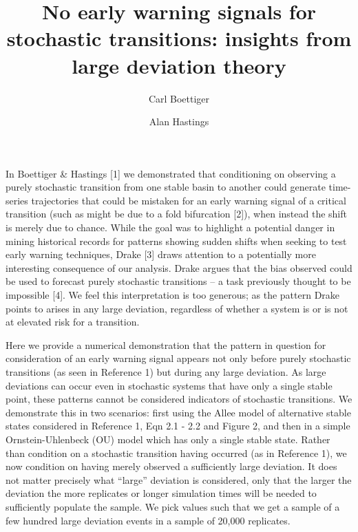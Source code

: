 \documentclass[review]{elsarticle} %
\begin{document}
\begin{frontmatter}
  \title{No early warning signals for stochastic transitions: insights from large
         deviation theory}
  \author[cstar]{Carl Boettiger}
  \address[cstar]{Center for Stock Assessment Research, Department of Applied Math and Statistics, University of California, Mail Stop SOE-2, Santa Cruz, CA 95064, USA}
  \author[esp]{Alan Hastings}
  \address[esp]{Department of Environmental Science and Policy, University of California, Davis, CA, 95616 United States}
 \end{frontmatter}


In Boettiger \& Hastings {[}1{]} we demonstrated that conditioning on
observing a purely stochastic transition from one stable basin to
another could generate time-series trajectories that could be mistaken
for an early warning signal of a critical transition (such as might be
due to a fold bifurcation {[}2{]}), when instead the shift is merely due
to chance. While the goal was to highlight a potential danger in mining
historical records for patterns showing sudden shifts when seeking to
test early warning techniques, Drake {[}3{]} draws attention to a
potentially more interesting consequence of our analysis. Drake argues
that the bias observed could be used to forecast purely stochastic
transitions -- a task previously thought to be impossible {[}4{]}. We
feel this interpretation is too generous; as the pattern Drake points to
arises in any large deviation, regardless of whether a system is or is
not at elevated risk for a transition.

Here we provide a numerical demonstration that the pattern in question
for consideration of an early warning signal appears not only before
purely stochastic transitions (as seen in Reference 1) but during any
large deviation. As large deviations can occur even in stochastic
systems that have only a single stable point, these patterns cannot be
considered indicators of stochastic transitions. We demonstrate this in
two scenarios: first using the Allee model of alternative stable states
considered in Reference 1, Eqn 2.1 - 2.2 and Figure 2, and then in a
simple Ornstein-Uhlenbeck (OU) model which has only a single stable
state. Rather than condition on a stochastic transition having occurred
(as in Reference 1), we now condition on having merely observed a
sufficiently large deviation. It does not matter precisely what
``large'' deviation is considered, only that the larger the deviation
the more replicates or longer simulation times will be needed to
sufficiently populate the sample. We pick values such that we get a
sample of a few hundred large deviation events in a sample of 20,000
replicates.
\end{document}
